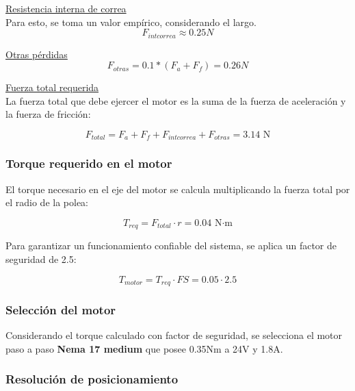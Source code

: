 \underline{Resistencia interna de correa}\\
Para esto, se toma un valor empírico, considerando el largo.
\begin{equation}
F_{intcorrea} \approx 0.25N
\end{equation}

\underline{Otras pérdidas}\\

\begin{equation}
    F_{otras}= 0.1*(F_a+F_f)=0.26N
\end{equation}

\underline{Fuerza total requerida}\\

La fuerza total que debe ejercer el motor es la suma de la fuerza de aceleración y la fuerza de fricción:

\begin{equation}
    F_{total} = F_a + F_f + F_{intcorrea} + F_{otras} = 3.14 \text{ N}
\end{equation}

\subsubsection{Torque requerido en el motor}

El torque necesario en el eje del motor se calcula multiplicando la fuerza total por el radio de la polea:

\begin{equation}
    T_{req} = F_{total} \cdot r = 0.04\text{ N·m}
\end{equation}

Para garantizar un funcionamiento confiable del sistema, se aplica un factor de seguridad de 2.5:

\begin{equation}
    T_{motor} = T_{req} \cdot FS = 0.05 \cdot 2.5
\end{equation}

\subsubsection{Selección del motor}

Considerando el torque calculado con factor de seguridad, se selecciona el motor paso a paso  \textbf{Nema 17 medium} que posee  0.35Nm a 24V y 1.8A. 

\subsubsection{Resolución de posicionamiento}

